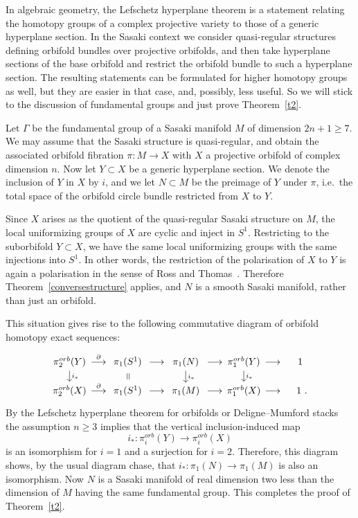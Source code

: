 \documentclass[12pt,leqno]{amsart}
\newcommand{\lra}{\longrightarrow}
\begin{document}
In algebraic geometry, the Lefschetz hyperplane theorem is a statement relating the homotopy
groups of a complex projective variety to those of a generic hyperplane section. In the Sasaki
context we consider quasi-regular structures defining orbifold bundles over projective orbifolds,
and then take hyperplane sections of the base orbifold and restrict the orbifold bundle to such
a hyperplane section. The resulting statements can be formulated for higher homotopy groups 
as well, but they are easier in that case, and, possibly, less useful. So we will stick to the 
discussion of fundamental groups and just prove Theorem~\ref{t2}.

Let $\Gamma$ be the fundamental group of a Sasaki manifold $M$ of dimension $2n+1\geq 7$. 
We may assume that the Sasaki structure is quasi-regular, and obtain the associated 
orbifold fibration $\pi\colon M\longrightarrow X$ with $X$ a projective orbifold of complex dimension $n$. 
Now let $Y\subset X$ be a generic hyperplane section. We denote the inclusion of $Y$ in $X$ by $i$,
and we let $N\subset M$ be the preimage of $Y$ under $\pi$, i.e.~the total space of the orbifold
circle bundle restricted from $X$ to $Y$. 

Since $X$ arises as the quotient of the quasi-regular Sasaki structure on $M$, the local uniformizing 
groups of $X$ are cyclic and inject in $S^1$. Restricting to the suborbifold $Y\subset X$, we 
have the same local uniformizing groups with the same injections into $S^1$. In other 
words, the restriction of the polarisation of $X$ to $Y$ is again a polarisation in the sense of 
Ross and Thomas~\cite[Definition~2.7]{RT}. Therefore Theorem~\ref{conversestructure} applies, and $N$ is
a smooth Sasaki manifold, rather than just an orbifold.


This situation gives rise to the following commutative diagram of orbifold homotopy exact sequences:
$$
\begin{tikzcd} [column sep={3em,between origins},
  row sep={3em,between origins},]
 \pi_2^{orb}(Y) \arrow[d, "i_*"] & \stackrel{\partial}{\lra} & \pi_1(S^1)\arrow[d, phantom , sloped , "="] & \lra & \pi_1(N) \arrow[d, "i_*"] & \lra & \pi_1^{orb}(Y) \arrow[d, "i_*"]& \lra & 1  \ \\
 \pi_2^{orb}(X) & \stackrel{\partial}{\lra} & \pi_1(S^1) & \lra & \pi_1(M) & \lra & \pi_1^{orb}(X)   & \lra & 1 \ .
\end{tikzcd}
$$
By the Lefschetz hyperplane theorem for orbifolds or Deligne--Mumford stacks~\cite{Halp} the assumption $n\geq 3$
implies that the vertical inclusion-induced map 
$$
i_*\colon \pi_i^{orb}(Y)\lra\pi_i^{orb}(X)
$$
is an isomorphism for $i=1$ and a surjection for $i=2$. Therefore, this diagram shows, by the usual diagram
chase, that $i_*\colon\pi_1(N)\lra\pi_1(M)$ is also an isomorphism. Now $N$ is a Sasaki manifold of real 
dimension two less than the dimension of $M$ having the same fundamental group. This completes the proof of Theorem~\ref{t2}.
\end{document}
